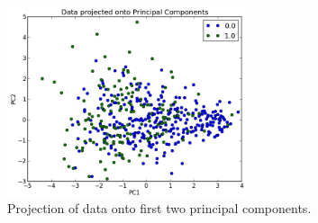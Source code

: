 \begin{figure}[H]
\centering
\includegraphics[width=7cm, keepaspectratio=true]{pictures/projectedToPCA.png}
\caption{Projection of data onto first two principal components.}
\label{PCAProjected}
\end{figure}